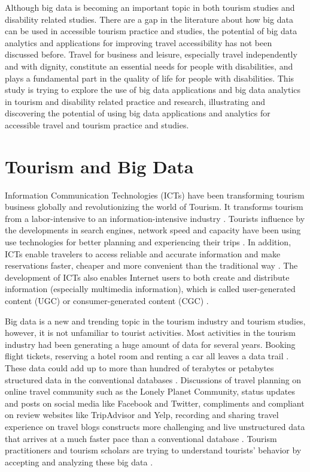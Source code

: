 Although big data is becoming an important topic in both tourism studies and disability
related studies. There are a gap in the literature about how big data can be used in 
accessible tourism practice and studies, the potential of big data analytics and applications
for improving travel accessibility has not been discussed before. Travel for business and
leisure, especially travel independently and with dignity, constitute an essential needs for
people with disabilities, and plays a fundamental part in the quality of life for people with
disabilities. This study is trying to explore the use of big data applications and big data
analytics in tourism and disability
related practice and research, illustrating and discovering the potential of using big data
applications and analytics for accessible travel and tourism practice and studies.

\section{Tourism and Big Data}
Information Communication Technologies (ICTs) have been transforming tourism business
globally and revolutionizing the world of Tourism. It transforms tourism from a
labor-intensive to an information-intensive industry \cite{Williams201787}.
Tourists influence by the developments in search engines, network speed and capacity 
have been using use technologies for better planning and experiencing their
trips \cite{XIE2017101}. In addition, ICTs enable travelers to access reliable and
accurate information and make reservations faster, cheaper and more convenient than
the traditional way \cite{chung2009}. The development of ICTs also enables Internet 
users to both create and distribute information (especially multimedia information), which is called user-generated 
content (UGC) or consumer-generated content (CGC) \cite{chung2009}.

Big data is a new and trending topic in the tourism industry and tourism studies, however, 
it is not unfamiliar to tourist activities. Most activities in the tourism industry had 
been generating a huge amount of data for several years. Booking flight tickets, 
reserving a hotel room and renting a car all leaves a data trail \cite{Shafiee16}.
These data could add up to more than hundred of terabytes or petabytes structured 
data in the conventional databases \cite{akerkar2012}. Discussions of travel planning
on online travel community such as the Lonely Planet Community, status updates and posts 
on social media like Facebook and Twitter, compliments and compliant on review websites 
like TripAdvisor and Yelp, recording and sharing travel experience on travel blogs
constructs more challenging and live unstructured data that arrives at a much
faster pace than a conventional database \cite{akerkar2012}. Tourism practitioners and
tourism scholars are trying to understand tourists' behavior by accepting and analyzing
these big data \cite{Shafiee16}.

